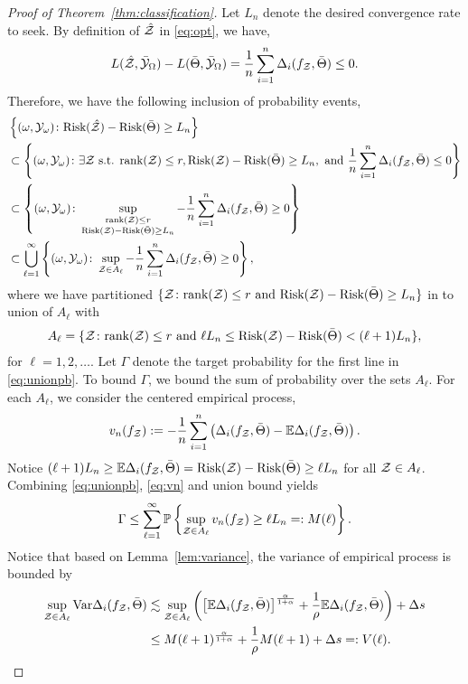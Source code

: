 \documentclass[11pt]{article}
\theoremstyle{plain}
\theoremstyle{definition}
\def\risk{\textup{Risk}}
\begin{document}
\begin{proof}[Proof of Theorem~\ref{thm:classification}]
Let $L_n$ denote the desired convergence rate to seek. By definition of $\hat {\mathcal{Z}}$ in \eqref{eq:opt}, we have, 
\[ L(\hat {\mathcal{Z}},\bar {\mathcal{Y}}_\Omega)-L(\bar \Theta,\bar {\mathcal{Y}}_\Omega) = \frac{1}{n}\sum_{i=1}^n\Delta_i(f_{\mathcal{Z}},\bar \Theta)\leq 0.\]
Therefore, we have the following inclusion of probability events,
\begin{align}\label{eq:unionpb}
&\left\{(\omega,\tY_{\omega})\colon \risk(\hat \tZ)-\risk(\bar\Theta)\geq L_n \right\}\nonumber\\
&\subset\left\{(\omega,\tY_{\omega})\colon\exists \tZ \text{ s.t. } \text{rank}(\tZ)\leq r,  \risk(\tZ)-\risk(\bar\Theta)\geq L_n, \text{ and } \frac{1}{n}\sum_{i=1}^n\Delta_i(f_\tZ,\bar \Theta)\leq 0 \right\}\nonumber\\
&\subset \left\{(\omega,\tY_{\omega})\colon\sup_{\substack{\text{rank}(\tZ)\leq r\\  
\risk(\tZ)-\risk(\bar\Theta)\geq L_n  }}-\frac{1}{n}\sum_{i=1}^n\Delta_i(f_\tZ,\bar \Theta)\geq 0\right\}\nonumber\\
&\subset \bigcup_{\ell=1}^{\infty}\left\{(\omega,\tY_\omega)\colon \sup_{\tZ\in A_{\ell}}-\frac{1}{n}\sum_{i=1}^n\Delta_i(f_\tZ,\bar \Theta)\geq 0\right\},
\end{align}
where we have partitioned $\{\tZ\colon \text{rank}(\tZ)\leq r \text{ and } \risk(\tZ)-\risk(\bar\Theta)\geq L_n\}$ in to union of $A_{\ell}$ with 
\begin{align}
A_{\ell} = \{\tZ\colon \text{rank}(\tZ)\leq r \text{ and } \ell L_n\leq  \risk(\tZ)-\risk(\bar\Theta)<(\ell+1)L_n\},
\end{align}
for $\ell = 1,2,\ldots$. Let $\Gamma$ denote the target probability for the first line in \eqref{eq:unionpb}. To bound $\Gamma$, we bound the sum of probability over the sets $A_{\ell}$.   For each $A_{\ell}$, we consider the centered empirical process,
\begin{align}\label{eq:vn}
v_n(f_{\mathcal{Z}}) := -\frac{1}{n}\sum_{i=1}^n \left(\Delta_i(f_{\mathcal{Z}},\bar \Theta)- \mathbb{E}\Delta_i(f_{\mathcal{Z}},\bar \Theta)\right).
\end{align}
Notice $(\ell+1)L_n\geq \mathbb{E}\Delta_i(f_\tZ,\bar \Theta) =\risk	(\tZ)-\risk(\bar\Theta)\geq \ell L_n$ for all $\mathcal{Z}\in A_{\ell}$.  Combining \eqref{eq:unionpb},  \eqref{eq:vn} and union bound yields
\begin{align}\label{eq:gammabd}
\Gamma\leq \sum_{\ell=1}^\infty\mathbb{P}\left\{\sup_{\mathcal{Z}\in A_{\ell}} v_n(f_{\mathcal{Z}})\geq  \ell L_n=:M(\ell) \right\}.
\end{align}
Notice that based on Lemma~\ref{lem:variance}, the variance of empirical process is bounded by 
\begin{align}
\sup_{\mathcal{Z}\in A_{\ell}}\textup{Var}\Delta_i(f_{\mathcal{Z}},\bar \Theta)& \lesssim \sup_{\mathcal{Z}\in A_{\ell}}\left( \left[\mathbb{E}\Delta_i(f_{\mathcal{Z}},\bar \Theta)\right]^{\alpha \over 1+\alpha}+{1\over \rho}\mathbb{E}\Delta_i(f_{\mathcal{Z}},\bar \Theta)\right)+\Delta s \\&\leq M(\ell+1)^{\alpha\over 1+\alpha}+\frac{1}{\rho}M(\ell+1) +\Delta s =: V(\ell).
\end{align}


\end{proof}
\end{document}
